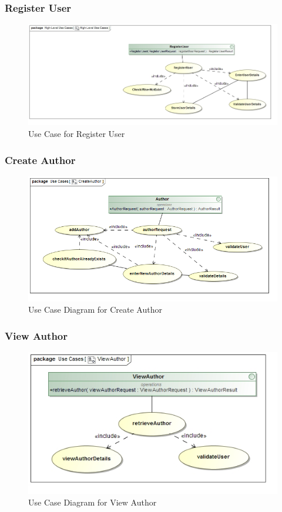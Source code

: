 \documentclass[a4paper,10pt]{article}
\begin{document}
	
\subsubsection{Register User}
	\begin{figure}[h]
		\includegraphics[scale=0.5]{UseRegisterUser}
	\caption{Use Case for Register User}
	\end{figure}

\subsubsection{Create Author}
	\begin{figure}[h]
		\includegraphics[scale=0.5]{Use_CreateAuthor}
		\caption{Use Case Diagram for Create Author}
	\end{figure}
	
\subsubsection{View Author}
	\begin{figure}[h]
		\includegraphics[scale=0.5]{UseViewAuthor}
		\caption{Use Case Diagram for View Author}
	\end{figure}
	
\end{document}
